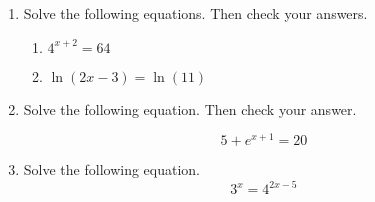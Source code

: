 


\begin{enumerate}
\item Solve the following equations.  Then check your answers.
\begin{enumerate}
\item $\displaystyle 4^{x+2}=64$
\vfill
\item $\ln(2x-3)=\ln(11)$
\vfill
\end{enumerate}


\item Solve the following equation.  Then check your answer.

 $$\displaystyle 5+e^{x+1}=20$$


\vfill
\vfill

\newpage

\item Solve the following equation.
$$3^x=4^{2x-5}$$



\end{enumerate}



